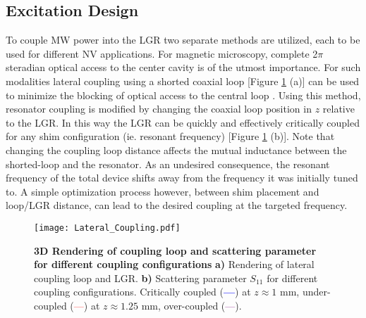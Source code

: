 \subsection{Excitation Design} \label{excitation}

To couple MW power into the LGR two separate methods are utilized, each to be used for different NV applications. For magnetic  microscopy, complete 2$\pi$ steradian optical access to the center cavity is of the utmost importance. For such modalities lateral coupling using a shorted coaxial loop [Figure \ref{LGR_Lateral} (a)] can be used to minimize the blocking of optical access to the central loop \cite{koskinen1992the}. Using this method, resonator coupling is modified by changing the coaxial loop position in $z$ relative to the LGR. In this way the LGR can be quickly and effectively critically coupled for any shim configuration (ie. resonant frequency) [Figure \ref{LGR_Lateral} (b)]. Note that changing the coupling loop distance affects the mutual inductance between the shorted-loop and the resonator. As an undesired consequence, the resonant frequency of the total device shifts away from the frequency it was initially tuned to. A simple optimization process however, between shim placement and loop/LGR distance, can lead to the desired coupling at the targeted frequency.

\begin{figure}[t!]
\centering
\texttt{[image: Lateral\_Coupling.pdf]}  
\caption{\textbf{3D Rendering of coupling loop and scattering parameter for different coupling configurations} \textbf{a)} Rendering of lateral coupling loop and LGR. \textbf{b)} Scattering parameter $S_{11}$ for different coupling configurations. Critically coupled (\textcolor{blue}{\textbf{---}}) at $z \approx 1$ mm, under-coupled (\textcolor{red}{---}) at $z \approx 1.25$ mm, over-coupled (\textcolor{purple}{---}). }
\label{LGR_Lateral}
\end{figure}

